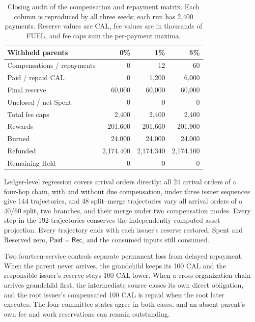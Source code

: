 \begin{table}[t]
  \caption{Closing audit of the compensation and repayment matrix. Each
    column is reproduced by all three seeds; each run has 2,400 payments.
    Reserve values are CAL, fee values are in thousands of FUEL, and fee
    caps sum the per-payment maxima.}
  \label{tab:eval-audit}
  \centering
  \small
  \begin{tabular}{@{}lrrr@{}}
    \toprule
    Withheld parents & 0\% & 1\% & 5\% \\
    \midrule
    Compensations / repayments & 0 & 12 & 60 \\
    Paid / repaid CAL & 0 & 1,200 & 6,000 \\
    Final reserve & 60,000 & 60,000 & 60,000 \\
    Unclosed / net Spent & 0 & 0 & 0 \\
    Total fee caps & 2,400 & 2,400 & 2,400 \\
    Rewards & 201.600 & 201.660 & 201.900 \\
    Burned & 24.000 & 24.000 & 24.000 \\
    Refunded & 2,174.400 & 2,174.340 & 2,174.100 \\
    Remaining Held & 0 & 0 & 0 \\
    \bottomrule
  \end{tabular}
\end{table}

Ledger-level regression covers arrival orders directly: all 24 arrival orders
of a four-hop chain, with and without due compensation, under three issuer
sequences give 144 trajectories, and 48 split--merge trajectories vary all
arrival orders of a 40/60 split, two branches, and their merge under two
compensation modes. Every step in the 192 trajectories conserves the
independently computed asset projection. Every trajectory ends with each
issuer's reserve restored, Spent and Reserved zero, $\mathsf{Paid}=\mathsf{Rec}$,
and the consumed inputs still consumed.

Two fourteen-service controls separate permanent loss from delayed
repayment. When the parent never arrives, the grandchild keeps its 100 CAL
and the responsible issuer's reserve stays 100 CAL lower. When a
cross-organization chain arrives grandchild first, the intermediate source
closes its own direct obligation, and the root issuer's compensated 100 CAL
is repaid when the root later executes. The four committee states agree in
both cases, and an absent parent's own fee and work reservations can remain
outstanding.

